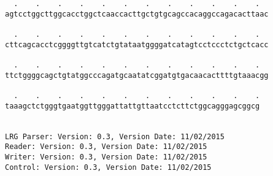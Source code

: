 \documentclass{article}
\begin{document}
\begin{Verbatim}
  .    .    .    .    .    .    .    .    .    .    .    .  
agtcctggcttggcacctggctcaaccacttgctgtgcagccacaggccagacacttaac
                                                            
  .    .    .    .    .    .    .    .    .    .    .    .  
cttcagcacctcggggttgtcatctgtataatggggatcatagtcctccctctgctcacc
                                                            
  .    .    .    .    .    .    .    .    .    .    .    .  
ttctggggcagctgtatggcccagatgcaatatcggatgtgacaacacttttgtaaacgg
                                                            
  .    .    .    .    .    .    .    .    .    .    .    .
taaagctctgggtgaatggttgggattattgttaatcctcttctggcagggagcggcg
                                                          
                                                          
LRG Parser: Version: 0.3, Version Date: 11/02/2015
Reader: Version: 0.3, Version Date: 11/02/2015
Writer: Version: 0.3, Version Date: 11/02/2015
Control: Version: 0.3, Version Date: 11/02/2015
\end{Verbatim}
\end{document}

